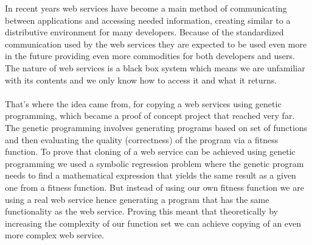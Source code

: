 In recent years web services have become a main method of communicating between applications
and accessing needed information, creating similar to a distributive environment for many developers.
Because of the standardized communication used by the web services they are expected to be used even 
more in the future providing even more commodities for both developers and users. The nature of web
services is a black box system which means we are unfamiliar with its contents and we only know how to
access it and what it returns. 
\paragraph{}
That's where the idea came from, for copying a web services using genetic
programming, which became a proof of concept project that reached very far. The genetic programming 
involves generating programs based on set of functions and then evaluating the quality (correctness)
of the program via a fitness function. To prove that cloning of a web service can be achieved using
genetic programming we used a symbolic regression problem where the genetic program needs to find a 
mathematical expression that yields the same result as a given one from a fitness function. But 
instead of using our own fitness function we are using a real web service hence generating a program
that has the same functionality as the web service. Proving this meant that theoretically by increasing 
the complexity of our function set we can achieve copying of an even more complex web service.
